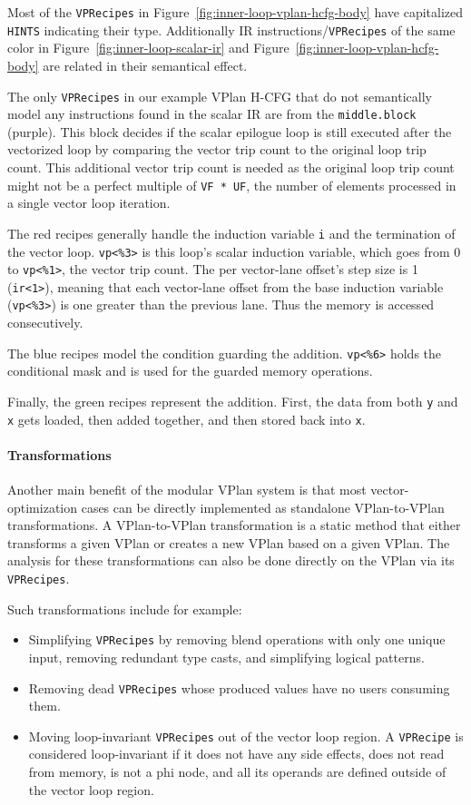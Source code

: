 \documentclass[sigplan,11pt,nonacm]{acmart}
\begin{document}
Most of the \texttt{VPRecipes} in Figure~\ref{fig:inner-loop-vplan-hcfg-body} have capitalized 
\texttt{HINTS} indicating their type. Additionally IR instructions/\texttt{VPRecipes} of the same color 
in Figure~\ref{fig:inner-loop-scalar-ir} and Figure~\ref{fig:inner-loop-vplan-hcfg-body}
are related in their semantical effect. 

The only \texttt{VPRecipes} in our example VPlan H-CFG that do not semantically model any 
instructions found in the scalar IR are from the \texttt{middle.block} (purple). 
This block decides if the scalar epilogue loop is still executed after the vectorized loop by 
comparing the vector trip count to the original loop trip count. This additional vector trip count is 
needed as the original loop trip count might not be a perfect multiple of \texttt{VF * UF}, the number of elements 
processed in a single vector loop iteration.

The red recipes generally handle the induction variable \texttt{i} and the termination of the 
vector loop. \texttt{vp<\%3>} is this loop's scalar induction variable, which goes from 0 to 
\texttt{vp<\%1>}, the vector trip count. The per vector-lane offset's step size is 1 (\texttt{ir<1>}), 
meaning that each 
vector-lane offset from the base induction variable (\texttt{vp<\%3>}) is one greater than the previous lane. 
Thus the memory is accessed consecutively.

The blue recipes model the condition guarding the addition. \texttt{vp<\%6>} holds the conditional mask 
and is used for the guarded memory operations.

Finally, the green recipes represent the addition. First, the data from both \texttt{y} and \texttt{x} 
gets loaded, then added together, and then stored back into \texttt{x}.

\paragraph{Transformations}
Another main benefit of the modular VPlan system is that most vector-optimization cases can 
be directly implemented as standalone VPlan-to-VPlan transformations. A VPlan-to-VPlan 
transformation is a static method that either transforms a given VPlan or creates a new 
VPlan based on a given VPlan. The analysis for these transformations can also be done 
directly on the VPlan via its \texttt{VPRecipes}.

Such transformations include for example:
\begin{itemize}
  \item Simplifying \texttt{VPRecipes} by removing blend operations with only one unique input, removing 
  redundant type casts, and simplifying logical patterns.
  \item Removing dead \texttt{VPRecipes} whose produced values have no users consuming them.
  \item Moving loop-invariant \texttt{VPRecipes} out of the vector loop region. A \texttt{VPRecipe} is 
  considered loop-invariant if it does not have any side effects, does not read from memory, is not a 
  phi node, and all its operands are defined outside of the vector loop region.
\end{itemize}
\end{document}
